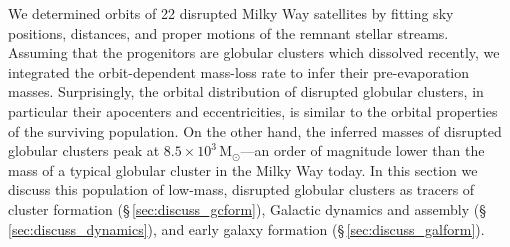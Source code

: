 \documentclass[twocolumn]{aastex63}
\newcommand{\msun}{\ensuremath{\textrm{M}_\odot}}
\begin{document}
We determined orbits of 22 disrupted Milky Way satellites by fitting sky positions, distances, and proper motions of the remnant stellar streams.
Assuming that the progenitors are globular clusters which dissolved recently, we integrated the orbit-dependent mass-loss rate to infer their pre-evaporation masses.
Surprisingly, the orbital distribution of disrupted globular clusters, in particular their apocenters and eccentricities, is similar to the orbital properties of the surviving population.
On the other hand, the inferred masses of disrupted globular clusters peak at $8.5\times10^3\,\msun$---an order of magnitude lower than the mass of a typical globular cluster in the Milky Way today.
In this section we discuss this population of low-mass, disrupted globular clusters as tracers of cluster formation (\S\,\ref{sec:discuss_gcform}), Galactic dynamics and assembly (\S\,\ref{sec:discuss_dynamics}), and early galaxy formation (\S\,\ref{sec:discuss_galform}).
\end{document}
